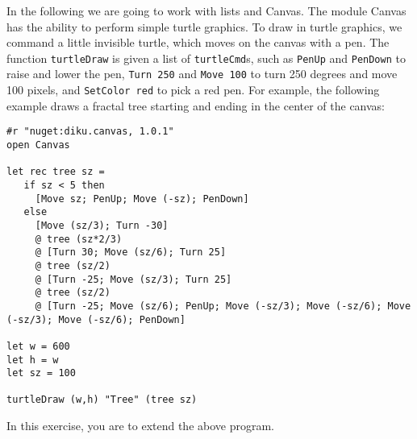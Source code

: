 In the following we are going to work with lists and Canvas. The module Canvas has the ability to perform simple turtle graphics. To draw in turtle graphics, we command a little invisible turtle, which moves on the canvas with a pen. The function \lstinline{turtleDraw} is given a list of \lstinline{turtleCmd}s, such as \lstinline{PenUp} and  \lstinline{PenDown} to raise and lower the pen, \lstinline{Turn 250} and \lstinline{Move 100} to turn 250 degrees and move 100 pixels, and \lstinline{SetColor red} to pick a red pen. For example, the following example draws a fractal tree starting and ending in the center of the canvas:
\begin{lstlisting}
#r "nuget:diku.canvas, 1.0.1"
open Canvas

let rec tree sz =
   if sz < 5 then 
     [Move sz; PenUp; Move (-sz); PenDown]
   else 
     [Move (sz/3); Turn -30] 
     @ tree (sz*2/3) 
     @ [Turn 30; Move (sz/6); Turn 25] 
     @ tree (sz/2) 
     @ [Turn -25; Move (sz/3); Turn 25] 
     @ tree (sz/2) 
     @ [Turn -25; Move (sz/6); PenUp; Move (-sz/3); Move (-sz/6); Move (-sz/3); Move (-sz/6); PenDown]

let w = 600
let h = w
let sz = 100

turtleDraw (w,h) "Tree" (tree sz)
\end{lstlisting}
In this exercise, you are to extend the above program.